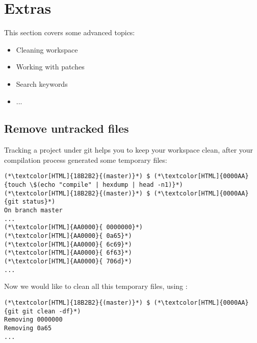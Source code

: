 \section{Extras}
\begin{frame}[fragile]
  \slidetitle
  This section covers some advanced topics:
  \begin{itemize}
    \item Cleaning workspace
    \item Working with patches
    \item Search keywords
    \item ...
  \end{itemize}
\end{frame}

\subsection{Remove untracked files}
\begin{frame}[fragile]
    \subslidetitle
  Tracking a project under git helps you to keep your workspace clean, after your compilation process generated some temporary files:

  \begin{lstlisting}
(*\textcolor[HTML]{18B2B2}{(master)}*) $ (*\textcolor[HTML]{0000AA}{touch \$(echo "compile" | hexdump | head -n1)}*)
(*\textcolor[HTML]{18B2B2}{(master)}*) $ (*\textcolor[HTML]{0000AA}{git status}*)
On branch master
...
(*\textcolor[HTML]{AA0000}{	0000000}*)
(*\textcolor[HTML]{AA0000}{	0a65}*)
(*\textcolor[HTML]{AA0000}{	6c69}*)
(*\textcolor[HTML]{AA0000}{	6f63}*)
(*\textcolor[HTML]{AA0000}{	706d}*)
...
\end{lstlisting}
  Now we would like to clean all this temporary files, using :
  \begin{lstlisting}
(*\textcolor[HTML]{18B2B2}{(master)}*) $ (*\textcolor[HTML]{0000AA}{git git clean -df}*)
Removing 0000000
Removing 0a65
...
\end{lstlisting}

\end{frame}

